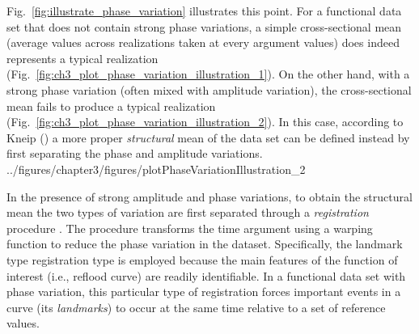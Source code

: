 Fig.~\ref{fig:illustrate_phase_variation} illustrates this point.
For a functional data set that does not contain strong phase variations, 
a simple cross-sectional mean (average values across realizations taken at every argument values) does indeed represents a typical realization (Fig.~\ref{fig:ch3_plot_phase_variation_illustration_1}).
On the other hand, with a strong phase variation (often mixed with amplitude variation), 
the cross-sectional mean fails to produce a typical realization (Fig.~\ref{fig:ch3_plot_phase_variation_illustration_2}).
In this case,
according to Kneip (\cite{Kneip1992}) a more proper \emph{structural} mean of the data set can be defined instead
by first separating the phase and amplitude variations.
{../figures/chapter3/figures/plotPhaseVariationIllustration_2}

In the presence of strong amplitude and phase variations, to obtain the structural mean the two types of variation are first separated through a \emph{registration} procedure \cite{Wang1997,Ramsay1998}.
The procedure transforms the time argument using a warping function to reduce the phase variation in the dataset.
Specifically, the landmark type registration type is employed because the main features of the function of interest (i.e., reflood curve) are readily identifiable.
In a functional data set with phase variation, this particular type of registration forces important events in a curve (its \emph{landmarks}) to occur at the same time relative to a set of reference values.

